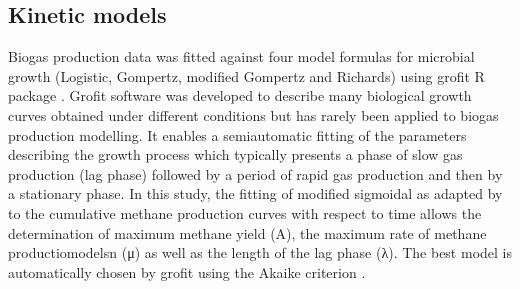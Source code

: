 \subsection{Kinetic models}
Biogas production data was fitted against four model formulas for microbial growth (Logistic, Gompertz, modified Gompertz and Richards) using grofit R package \cite{Kahm_2010}. Grofit software was developed to describe many biological growth curves obtained under different conditions but has rarely been applied to biogas production modelling. It enables a semiautomatic fitting of the parameters describing the growth process which typically presents a phase of slow gas production (lag phase) followed by a period of rapid gas production and then by a stationary phase. In this study, the fitting of modified sigmoidal  as adapted by \cite{Zwietering1990} to the cumulative methane production curves  with respect to time allows the determination of maximum methane yield (A), the maximum rate of methane productiomodelsn (μ) as well as the length of the lag phase (λ). The best model is automatically chosen by grofit using the Akaike criterion \cite{Hasenbrink_2006}.